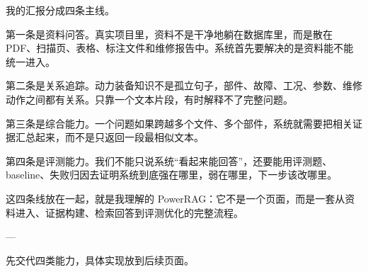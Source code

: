\documentclass[10pt, a4paper]{ctexart}
\begin{document}
\begin{tcolorbox}[colback=white, colframe=primary!35, title={\textbf{第 2 页：汇报主线}}, beforeafter skip=2.0pt]
\begin{minipage}[t]{0.72\textwidth}
  \linespread{1.0}\selectfont\footnotesize
  我的汇报分成四条主线。

第一条是资料问答。真实项目里，资料不是干净地躺在数据库里，而是散在 PDF、扫描页、表格、标注文件和维修报告中。系统首先要解决的是资料能不能统一进入。

第二条是关系追踪。动力装备知识不是孤立句子，部件、故障、工况、参数、维修动作之间都有关系。只靠一个文本片段，有时解释不了完整问题。

第三条是综合能力。一个问题如果跨越多个文件、多个部件，系统就需要把相关证据汇总起来，而不是只返回一段最相似文本。

第四条是评测能力。我们不能只说系统“看起来能回答”，还要能用评测题、baseline、失败归因去证明系统到底强在哪里，弱在哪里，下一步该改哪里。

这四条线放在一起，就是我理解的 PowerRAG：它不是一个页面，而是一套从资料进入、证据构建、检索回答到评测优化的完整流程。

---
\end{minipage}
\hfill
\begin{minipage}[t]{0.25\textwidth}
  \fontsize{7.5}{9.5}\selectfont
  \begin{tcolorbox}[colback=orange!5, colframe=orange!45, title=\textbf{讲述重点}, left=0.6mm, right=0.6mm, top=0.8mm, bottom=0.8mm, arc=0.8mm, boxrule=0.4pt, beforeafter skip=0pt]
    先交代四类能力，具体实现放到后续页面。
  \end{tcolorbox}
\end{minipage}
\end{tcolorbox}
\end{document}
